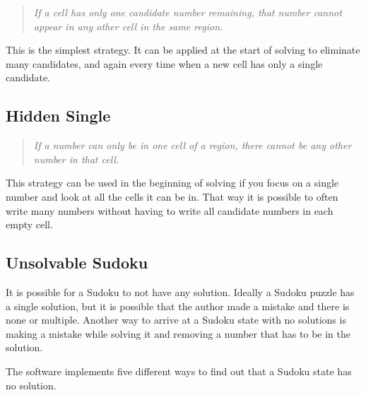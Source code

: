 \begin{quote}
    \textit{
        If a cell has only one candidate number remaining,
        that number cannot appear in any other cell in the same region.
    }
\end{quote}

This is the simplest strategy.
It can be applied at the start of solving to eliminate many candidates,
and again every time when a new cell has only a single candidate.


\subsection*{Hidden Single}

\begin{quote}
    \textit{
        If a number can only be in one cell of a region, there cannot be any other number in that cell.
    }
\end{quote}

This strategy can be used in the beginning of solving if you focus on a single number
and look at all the cells it can be in.
That way it is possible to often write many numbers without having to write all candidate numbers in each empty cell.


\subsection*{Unsolvable Sudoku}

It is possible for a Sudoku to not have any solution.
Ideally a Sudoku puzzle has a single solution,
but it is possible that the author made a mistake and there is none or multiple.
Another way to arrive at a Sudoku state with no solutions is making a mistake while solving it and removing a number
that has to be in the solution.

The software implements five different ways to find out that a Sudoku state has no solution.


